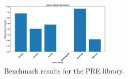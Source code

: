 \begin{figure}
	\centering
	\includegraphics[width=0.48\textwidth]{figs/pre-bench}
	\caption{Benchmark results for the PRE library.}
	\label{fig:pre-bench}
\end{figure}






%



